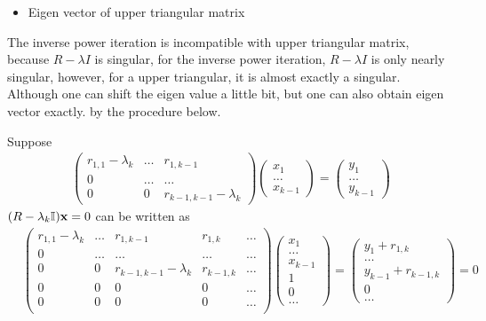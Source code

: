 \begin{itemize}
  \item Eigen vector of upper triangular matrix
\end{itemize}

The inverse power iteration is incompatible with upper triangular matrix, because $R-\lambda I$ is singular, for the inverse power iteration, $R-\lambda I$ is only nearly singular, however, for a upper triangular, it is almost exactly a singular. Although one can shift the eigen value a little bit, but one can also obtain eigen vector exactly. by the procedure below.

Suppose
\begin{equation}
\begin{split}
\left(\begin{array}{ccccc}
r_{1,1}-\lambda_k & \ldots & r_{1,k-1} \\
                0 & \ldots & \ldots    \\
                0 &      0 & r_{k-1,k-1}-\lambda _k
\end{array}\right)
\left(\begin{array}{c} x_1 \\ \ldots \\ x_{k-1} \end{array}\right)=\left(\begin{array}{c} y_1 \\ \ldots \\ y_{k-1} \end{array}\right)
\end{split}
\end{equation}
$(R-\lambda _k \mathbb{I}){\bf x} = 0$ can be written as
\begin{equation}
\begin{split}
&\left(\begin{array}{ccccc}
r_{1,1}-\lambda_k & \ldots & r_{1,k-1}   & r_{1,k}   & \ldots \\
      0 & \ldots & \ldots      & \ldots    & \ldots \\
      0 &      0 & r_{k-1,k-1}-\lambda _k & r_{k-1,k} & \ldots \\
      0 &      0 & 0           & 0         & \ldots \\
      0 &      0 & 0           & 0         & \ldots \\
\end{array}\right)
\left(\begin{array}{c} x_1 \\ \ldots \\ x_{k-1} \\ 1 \\ 0 \\ \ldots \end{array}\right)=
\left(\begin{array}{c} y_1+r_{1,k} \\ \ldots \\ y_{k-1}+r_{k-1,k} \\ 0 \\ \ldots \end{array}\right)=0
\end{split}
\end{equation}
